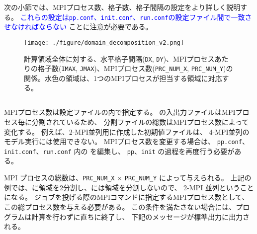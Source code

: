 次の小節では、MPIプロセス数、格子数、格子間隔の設定をより詳しく説明する。
\textcolor{blue}{これらの設定は\texttt{pp.conf}、\texttt{init.conf}、\texttt{run.conf}の設定ファイル間で一致させなければならない}
ことに注意が必要である。

\begin{figure}[h]
\begin{center}
  \texttt{[image: ./figure/domain\_decomposition\_v2.png]}\\
  \caption{計算領域全体に対する、水平格子間隔(\texttt{DX}, \texttt{DY})、MPIプロセスあたりの格子数(\texttt{IMAX}, \texttt{JMAX})、MPIプロセス数(\texttt{PRC\_NUM\_X}, \texttt{PRC\_NUM\_Y})の関係。水色の領域は、1つのMPIプロセスが担当する領域に対応する。}
  \label{fig:domain}
\end{center}
\end{figure}

\subsection{\SubsecMPIProcess} \label{subsec:relation_dom_reso2}

MPIプロセス数は設定ファイルの内で指定する。
\scalerm の入出力ファイルはMPIプロセス毎に分割されているため、
分割ファイルの総数はMPIプロセス数によって変化する。
例えば、2-MPI並列用に作成した初期値ファイルは、
4-MPI並列のモデル実行には使用できない。
MPIプロセス数を変更する場合は、
\verb|pp.conf|、\verb|init.conf|、\verb|run.conf| 内の
を編集し、
\verb|pp|、\verb|init| の過程を再度行う必要がある。

MPI プロセスの総数は、\verb|PRC_NUM_X| $\times$ \verb|PRC_NUM_Y|  によって与えられる。
上記の例では、\XDIR に領域を2分割し、\YDIR には領域を分割しないので、
2-MPI 並列ということになる。
ジョブを投げる際のMPIコマンドに指定するMPIプロセス数として、この総プロセス数を与える必要がある。
この条件を満たさない場合には、プログラムは計算を行わずに直ちに終了し、
下記のメッセージが標準出力に出力される。

